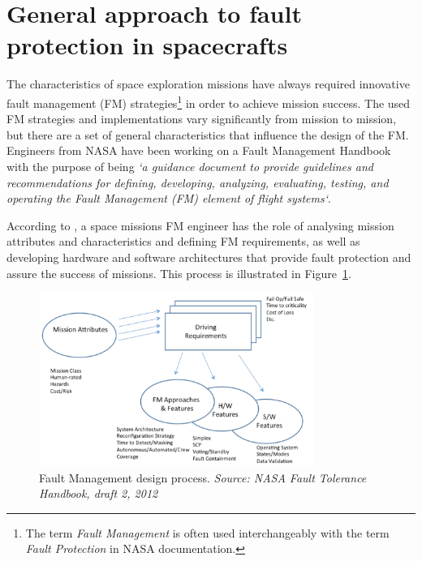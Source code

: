 \section{General approach to fault protection in spacecrafts}
The characteristics of space exploration missions have always required
innovative fault management (FM) strategies\footnote{The term \textit{Fault
Management} is often used interchangeably with the term \textit{Fault
Protection} in NASA documentation.} in order to achieve mission success.
The used FM strategies and implementations vary significantly from mission to
mission, but there are a set of general characteristics that influence the
design of the FM. Engineers from NASA have been working on a Fault Management
Handbook with the purpose of being \textit{`a guidance document to provide
guidelines and recommendations for defining, developing, analyzing, evaluating,
testing, and operating the Fault Management (FM) element of flight
systems`}\cite{nasa-fm-handbook}.
 
According to \cite{nasa-fm-handbook}, a space missions FM engineer has the role
of analysing mission attributes and characteristics and defining FM
requirements, as well as developing hardware and software architectures that
provide fault protection and assure the success of missions. This process is
illustrated in Figure~\ref{fig:fm_design}.

\begin{figure}[htb] 
	\begin{center}
	\includegraphics[width=0.8\textwidth]{img/fm_design.png}
	\caption{Fault Management design process. \small{\textit{Source: NASA Fault
	Tolerance Handbook, draft 2, 2012}}}
	\label{fig:fm_design}
	\end{center}
\end{figure}

